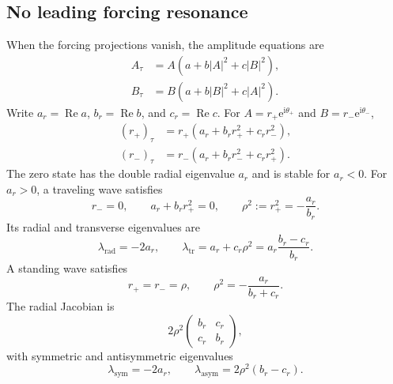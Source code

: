 \documentclass[11pt]{article}
\newcommand{\ii}{\mathrm{i}}
\newcommand{\ee}{\mathrm{e}}
\DeclareMathOperator{\RePart}{Re}
\begin{document}
\subsection{No leading forcing resonance}

When the forcing projections vanish, the amplitude equations are
\begin{subequations}
\label{eq:unforced-amplitude}
\begin{align}
 A_\tau&=A(a+b|A|^2+c|B|^2),
 \label{eq:A-unforced}\\
 B_\tau&=B(a+b|B|^2+c|A|^2).
 \label{eq:B-unforced}
\end{align}
\end{subequations}
Write $a_r=\RePart a$, $b_r=\RePart b$, and $c_r=\RePart c$.  For
$A=r_+\ee^{\ii\theta_+}$ and $B=r_-\ee^{\ii\theta_-}$,
\begin{subequations}
\label{eq:radial-system}
\begin{align}
 (r_+)_\tau&=r_+(a_r+b_rr_+^2+c_rr_-^2),\\
 (r_-)_\tau&=r_-(a_r+b_rr_-^2+c_rr_+^2).
\end{align}
\end{subequations}
The zero state has the double radial eigenvalue $a_r$ and is stable for
$a_r<0$.  For $a_r>0$, a traveling wave satisfies
\begin{equation}
 r_- =0,
 \qquad a_r+b_rr_+^2=0,
 \qquad \rho^2:=r_+^2=-\frac{a_r}{b_r}.
 \label{eq:TW-balance}
\end{equation}
Its radial and transverse eigenvalues are
\begin{equation}
 \lambda_{\mathrm{rad}}=-2a_r,
 \qquad
 \lambda_{\mathrm{tr}}=a_r+c_r\rho^2
 =a_r\frac{b_r-c_r}{b_r}.
 \label{eq:TW-eigenvalues}
\end{equation}
A standing wave satisfies
\begin{equation}
 r_+=r_-=\rho,
 \qquad
 \rho^2=-\frac{a_r}{b_r+c_r}.
 \label{eq:SW-balance}
\end{equation}
The radial Jacobian is
\begin{equation}
 2\rho^2
 \begin{pmatrix}b_r&c_r\\c_r&b_r\end{pmatrix},
 \label{eq:SW-Jacobian}
\end{equation}
with symmetric and antisymmetric eigenvalues
\begin{equation}
 \lambda_{\mathrm{sym}}=-2a_r,
 \qquad
 \lambda_{\mathrm{asym}}=2\rho^2(b_r-c_r).
 \label{eq:SW-eigenvalues}
\end{equation}
\end{document}
